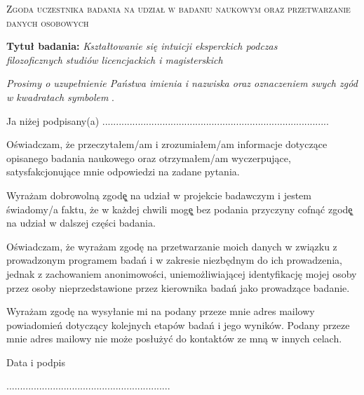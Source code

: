\documentclass[a4paper, polish]{article}
\date{\vspace{-5ex}}
\newcommand{\xmark}{\ding{55}}
\begin{document}
\begin{center}
\textsc{\Large Zgoda uczestnika badania na udział w badaniu naukowym oraz przetwarzanie danych osobowych}
\end{center}

\vspace{2em}
\noindent \nohyphens{\textbf{\large Tytuł badania:} \textit{\large Kształtowanie się intuicji eksperckich podczas \\ filozoficznych studiów licencjackich i magisterskich}}

\vspace{2em}

\textit{Prosimy o uzupełnienie Państwa imienia i nazwiska oraz oznaczeniem swych zgód w kwadratach symbolem \xmark}.

\vspace{2em}

Ja niżej podpisany(a) ...................................................................................

\begin{terms}
\item Oświadczam, że przeczytałem/am i zrozumiałem/am informacje dotyczące opisanego badania naukowego oraz otrzymałem/am wyczerpujące, satysfakcjonujące mnie odpowiedzi na zadane pytania.

\item Wyrażam dobrowolną zgodę̨ na udział w projekcie badawczym i jestem świadomy/a faktu, że w każdej chwili mogę̨ bez podania przyczyny cofnąć zgodę̨ na udział w dalszej części badania.

\item Oświadczam, że wyrażam zgodę na przetwarzanie moich danych w związku z prowadzonym programem badań i w zakresie niezbędnym do ich prowadzenia, jednak z zachowaniem anonimowości, uniemożliwiającej identyfikację mojej osoby przez osoby nieprzedstawione przez kierownika badań jako prowadzące badanie.

\item Wyrażam zgodę na wysyłanie mi na podany przeze mnie adres mailowy powiadomień dotyczący kolejnych etapów badań i jego wyników. Podany przeze mnie adres mailowy nie może posłużyć do kontaktów ze mną w innych celach.

\end{terms}

\vspace{2em}

Data i podpis

\vspace{2em}

............................................................
\end{document}
